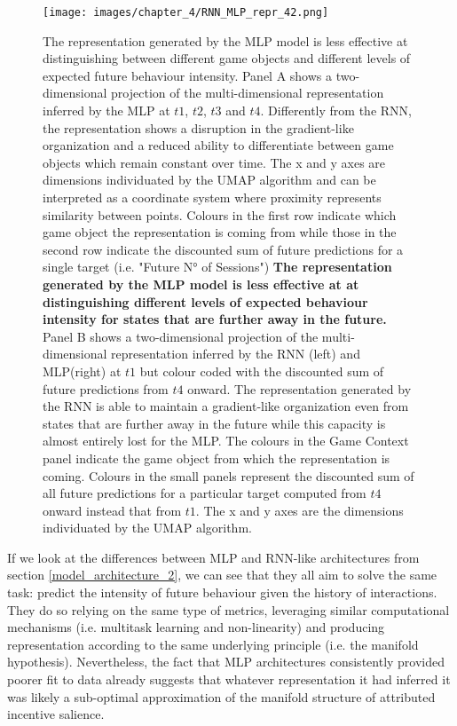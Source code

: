 \begin{figure}[!htb]
\centering
\texttt{[image: images/chapter\_4/RNN\_MLP\_repr\_42.png]}
\caption[\textbf{Lower dimensional representation of the latent states generated by the time-distributed MLP architecture}]{The representation generated by the MLP model is less effective at distinguishing between different game objects and different levels of expected future behaviour intensity. Panel A shows a two-dimensional projection of the multi-dimensional representation inferred by the MLP at $t1$, $t2$, $t3$ and $t4$. Differently from the RNN, the representation shows a disruption in the gradient-like organization and a reduced ability to differentiate between game objects which remain constant over time. The x and y axes are dimensions individuated by the UMAP algorithm and can be interpreted as a coordinate system where proximity represents similarity between points. Colours in the first row indicate which game object the representation is coming from while those in the second row indicate the discounted sum of future predictions for a single target (i.e. "Future N° of Sessions") \textbf{The representation generated by the MLP model is less effective at at distinguishing different levels of expected behaviour intensity for states that are further away in the future.} Panel B shows a two-dimensional projection of the multi-dimensional representation inferred by the RNN (left) and MLP(right) at $t1$ but colour coded with the discounted sum of future predictions from $t4$ onward. The representation generated by the RNN is able to maintain a gradient-like organization even from states that are further away in the future while this capacity is almost entirely lost for the MLP. The colours in the Game Context panel indicate the game object from which the representation is coming. Colours in the small panels represent the discounted sum of all future predictions for a particular target computed from $t4$ onward instead that from $t1$. The x and y axes are the dimensions individuated by the UMAP algorithm.}
\label{predictive_panel}
\end{figure}

If we look at the differences between MLP and RNN-like architectures from section \ref{model_architecture_2}, we can see that they all aim to solve the same task: predict the intensity of future behaviour given the history of interactions. They do so relying on the same type of metrics, leveraging similar computational mechanisms (i.e. multitask learning and non-linearity) and producing representation according to the same underlying principle (i.e. the manifold hypothesis). Nevertheless, the fact that MLP architectures consistently provided poorer fit to data already suggests that whatever representation it had inferred it was likely a sub-optimal approximation of the manifold structure of attributed incentive salience. 

